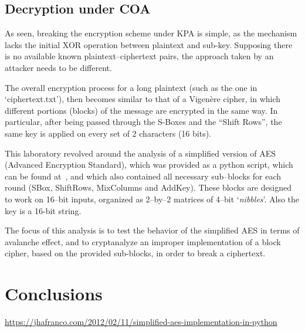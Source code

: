 \documentclass[12pt]{article}
\begin{document}
\subsection{Decryption under COA}
\label{sec:03.1}

As seen, breaking the encryption scheme under KPA is simple, as the mechanism lacks the initial XOR operation between plaintext and sub-key.
Supposing there is no available known plaintext–ciphertext pairs, the approach taken by an attacker needs to be different.

The overall encryption process for a long plaintext (such as the one in `ciphertext.txt'), then becomes similar to that of a Vigenère cipher, in which different portions (blocks) of the message are encrypted in the same way. In particular, after being passed through the S-Boxes and the ``Shift Rows'', the same key is applied on every set of 2 characters (16 bits).

This laboratory revolved around the analysis of a simplified version of AES (Advanced Encryption Standard), which was provided as a python script, which can be found at~\cite{Original Python implementation}, and which also contained all necessary sub–blocks for each round (SBox, ShiftRows, MixColumns and AddKey).
These blocks are designed to work on 16–bit inputs, organized as 2–by–2 matrices of 4–bit `\textit{nibbles}'. Also the key is a 16-bit string.

The focus of this analysis is to test the behavior of the simplified AES in terms of avalanche effect, and to cryptanalyze an improper implementation of a block cipher, based on the provided sub-blocks, in order to break a ciphertext.


\section{Conclusions}
\label{sec:04}

\begin{thebibliography}{5}
    \url{https://jhafranco.com/2012/02/11/simplified-aes-implementation-in-python}
\end{thebibliography}
\end{document}

